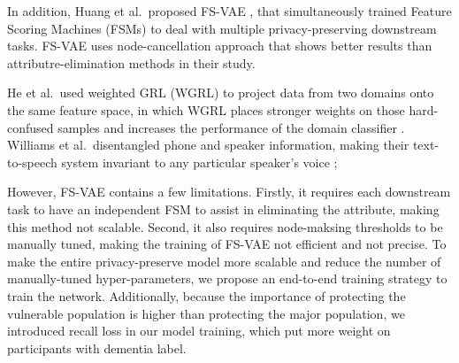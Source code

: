 \documentclass[lettersize,journal]{IEEEtran}
\begin{document}
In addition, Huang et al.\ proposed FS-VAE \cite{huang2022attention}, that simultaneously trained Feature Scoring Machines (FSMs) to deal with multiple privacy-preserving downstream tasks. FS-VAE uses node-cancellation approach that shows better results than attributre-elimination methods in their study. 

He et al.\ used weighted GRL (WGRL) to project data from two domains onto the same feature space, in which WGRL places stronger weights on those hard-confused samples and increases the performance of the domain classifier \cite{he2019multi}.
Williams et al.\ disentangled phone and speaker information, making their text-to-speech system invariant to any particular speaker's voice \cite{williams2021learning};

However, FS-VAE contains a few limitations. Firstly, it requires each downstream task to have an independent FSM to assist in eliminating the attribute, making this method not scalable. Second, it also requires node-maksing thresholds to be manually tuned, making the training of FS-VAE not efficient and not precise. To make the entire privacy-preserve model more scalable and reduce the number of manually-tuned hyper-parameters, we propose an end-to-end training strategy to train the network. Additionally, because the importance of protecting the vulnerable population is higher than protecting the major population, we introduced recall loss in our model training, which put more weight on participants with dementia label. 
\end{document}
